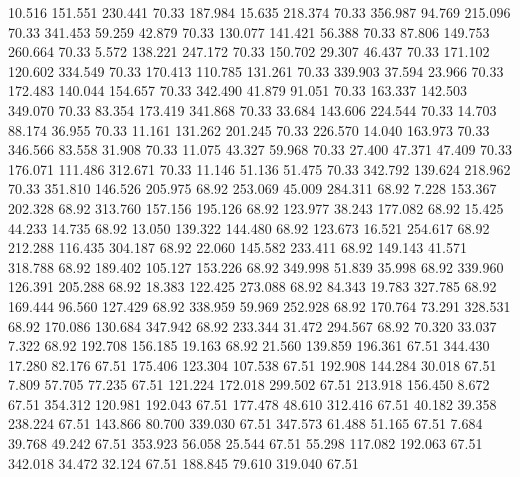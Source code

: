   10.516  151.551  230.441        70.33
 187.984   15.635  218.374        70.33
 356.987   94.769  215.096        70.33
 341.453   59.259   42.879        70.33
 130.077  141.421   56.388        70.33
  87.806  149.753  260.664        70.33
   5.572  138.221  247.172        70.33
 150.702   29.307   46.437        70.33
 171.102  120.602  334.549        70.33
 170.413  110.785  131.261        70.33
 339.903   37.594   23.966        70.33
 172.483  140.044  154.657        70.33
 342.490   41.879   91.051        70.33
 163.337  142.503  349.070        70.33
  83.354  173.419  341.868        70.33
  33.684  143.606  224.544        70.33
  14.703   88.174   36.955        70.33
  11.161  131.262  201.245        70.33
 226.570   14.040  163.973        70.33
 346.566   83.558   31.908        70.33
  11.075   43.327   59.968        70.33
  27.400   47.371   47.409        70.33
 176.071  111.486  312.671        70.33
  11.146   51.136   51.475        70.33
 342.792  139.624  218.962        70.33
 351.810  146.526  205.975        68.92
 253.069   45.009  284.311        68.92
   7.228  153.367  202.328        68.92
 313.760  157.156  195.126        68.92
 123.977   38.243  177.082        68.92
  15.425   44.233   14.735        68.92
  13.050  139.322  144.480        68.92
 123.673   16.521  254.617        68.92
 212.288  116.435  304.187        68.92
  22.060  145.582  233.411        68.92
 149.143   41.571  318.788        68.92
 189.402  105.127  153.226        68.92
 349.998   51.839   35.998        68.92
 339.960  126.391  205.288        68.92
  18.383  122.425  273.088        68.92
  84.343   19.783  327.785        68.92
 169.444   96.560  127.429        68.92
 338.959   59.969  252.928        68.92
 170.764   73.291  328.531        68.92
 170.086  130.684  347.942        68.92
 233.344   31.472  294.567        68.92
  70.320   33.037    7.322        68.92
 192.708  156.185   19.163        68.92
  21.560  139.859  196.361        67.51
 344.430   17.280   82.176        67.51
 175.406  123.304  107.538        67.51
 192.908  144.284   30.018        67.51
   7.809   57.705   77.235        67.51
 121.224  172.018  299.502        67.51
 213.918  156.450    8.672        67.51
 354.312  120.981  192.043        67.51
 177.478   48.610  312.416        67.51
  40.182   39.358  238.224        67.51
 143.866   80.700  339.030        67.51
 347.573   61.488   51.165        67.51
   7.684   39.768   49.242        67.51
 353.923   56.058   25.544        67.51
  55.298  117.082  192.063        67.51
 342.018   34.472   32.124        67.51
 188.845   79.610  319.040        67.51
